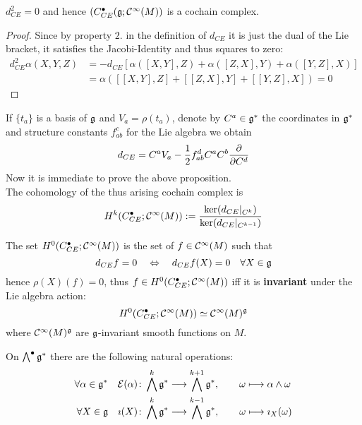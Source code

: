 \begin{prop}
  $d_{CE}^2 = 0$ and hence $(C_{CE}^\bullet(\mathfrak{g} ; \mathcal{C}^{\infty}(M))$ is a cochain complex.
\begin{proof}
  Since by property $2.$ in the definition of $d_{CE}$ it is just the dual of the Lie bracket, it satisfies the Jacobi-Identity and thus squares to zero:
  \begin{align}
    d^2_{CE} \alpha(X,Y,Z) &= - d_{CE} \left[ \alpha([X,Y],Z) + \alpha([Z,X],Y) + \alpha([Y,Z],X) \right] \\
    &= \alpha([[X,Y],Z] + [[Z,X],Y] + [[Y,Z],X]) = 0
  \end{align}
\end{proof}
\end{prop}

If $\{t_a\}$ is a basis of $\mathfrak{g}$ and $V_a = \rho(t_a)$, denote by $C^a \in \mathfrak{g}^*$ the coordinates in $\mathfrak{g}^*$ and structure constants $f_{ab}^c$ for the Lie algebra we obtain
\begin{equation}
  d_{CE} = C^a V_a - \frac{1}{2} f^d_{ab} C^a C^b \frac{\partial }{\partial C^d}
\end{equation}
Now it is immediate to prove the above proposition.\\

The cohomology of the thus arising cochain complex is
\begin{equation}
  H^k(C_{CE}^\bullet; \mathcal{C}^{\infty}(M)) := \frac{\ker(d_{CE}|_{C^k})}{\ker(d_{CE}|_{C^{k-1}})}
\end{equation}

\begin{rem}
  The set $H^0 (C_{CE}^\bullet; \mathcal{C}^{\infty}(M))$ is the set of $f \in \mathcal{C}^{\infty}(M)$ such that
  \begin{equation}d_{CE} f = 0 \quad \Leftrightarrow \quad d_{CE} f(X) = 0 \quad \forall X\in \mathfrak{g} \end{equation}
  hence $\rho(X)(f) = 0$, thus $f \in H^0 (C_{CE}^\bullet; \mathcal{C}^{\infty}(M))$ iff it is \textbf{invariant} under the Lie algebra action:
  \begin{equation}
    H^0 (C_{CE}^\bullet; \mathcal{C}^{\infty}(M)) \simeq \mathcal{C}^{\infty}(M)^{\mathfrak{g}}
  \end{equation}
  where $\mathcal{C}^{\infty}(M)^{\mathfrak{g}}$ are $\mathfrak{g}$-invariant smooth functions on $M$.
\end{rem}

On $\bigwedge^\bullet \mathfrak{g}^*$ there are the following natural operations:
\begin{align}
  \forall \alpha \in \mathfrak{g}^* \quad \mathcal{E}(\alpha) \colon \bigwedge^k \mathfrak{g}^* &\longrightarrow \bigwedge^{k+1} \mathfrak{g}^*, \quad \quad \omega \longmapsto \alpha \wedge \omega \\
  \forall X \in \mathfrak{g} \quad \imath(X) \colon \bigwedge^k \mathfrak{g}^* &\longrightarrow \bigwedge^{k-1} \mathfrak{g}^*, \quad \quad \omega \longmapsto \imath_X (\omega)
\end{align}

